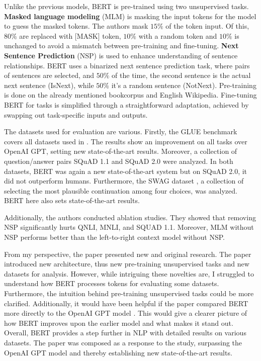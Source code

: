 \documentclass[times, utf8, seminar]{fer}
\begin{document}
Unlike the previous models, BERT is pre-trained using two unsupervised tasks. \textbf{Masked language modeling} (MLM) is masking the input tokens for the model to guess the masked tokens. The authors mask $15\%$ of the token input. Of this, $80\%$ are replaced with [MASK] token, $10\%$ with a random token and $10\%$ is unchanged to avoid a mismatch between pre-training and fine-tuning. \textbf{Next Sentence Prediction} (NSP) is used to enhance understanding of sentence relationships. BERT uses a binarized next sentence prediction task, where pairs of sentences are selected, and $50\%$ of the time, the second sentence is the actual next sentence (IsNext), while $50\%$ it's a random sentence (NotNext). Pre-training is done on the already mentioned bookcorpus \citep{zhu2015aligning} and English Wikipedia. Fine-tuning BERT for tasks is simplified through a straightforward adaptation, achieved by swapping out task-specific inputs and outputs.


The datasets used for evaluation are various. Firstly, the GLUE benchmark covers all datasets used in \citep{radford2018improving}. The results show an improvement on all tasks over OpenAI GPT, setting new state-of-the-art results. Moreover, a collection of question/answer pairs SQuAD 1.1\citep{rajpurkar2016squad} and SQuAD 2.0 were analyzed. In both datasets, BERT was again a new state-of-the-art system but on SQuAD 2.0, it did not outperform humans. Furthermore, the SWAG dataset \citep{zellers2018swag}, a collection of selecting the most plausible continuation among four choices, was analyzed. BERT here also sets state-of-the-art results.


Additionally, the authors conducted ablation studies. They showed that removing NSP significantly hurts QNLI, MNLI, and SQUAD 1.1. Moreover, MLM without NSP performs better than the left-to-right context model without NSP.


From my perspective, the paper presented new and original research. The paper introduced new architecture, thus new pre-training unsupervised tasks and new datasets for analysis. However, while intriguing these novelties are, I struggled to understand how BERT processes tokens for evaluating some datasets. Furthermore, the intuition behind pre-training unsupervised tasks could be more clarified. Additionally, it would have been helpful if the paper compared BERT more directly to the OpenAI GPT model \citep{radford2018improving}. This would give a clearer picture of how BERT improves upon the earlier model and what makes it stand out. Overall, BERT provides a step further in NLP with detailed results on various datasets. The paper was composed as a response to the \citep{radford2018improving} study, surpassing the OpenAI GPT model and thereby establishing new state-of-the-art results.
\end{document}
